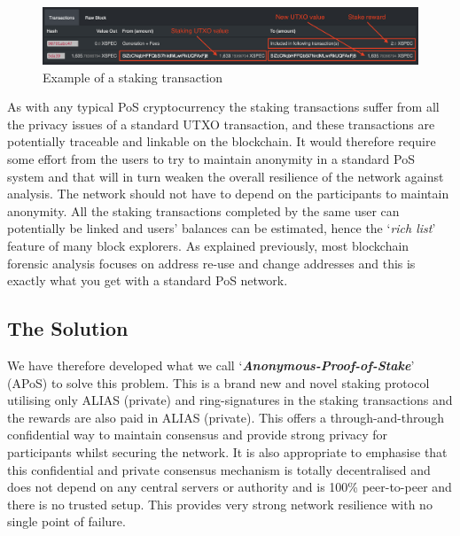 \begin{figure}[h]
    \centering
    \includegraphics[width=\textwidth]{Images/txnexample.png}
    \caption{Example of a staking transaction}
    \label{fig}
\end{figure}


\noindent
As with any typical PoS cryptocurrency the staking transactions suffer
from all the privacy issues of a standard UTXO transaction, and these
transactions are potentially traceable and linkable on the blockchain.
It would therefore require some effort from the users to try to maintain
anonymity in a standard PoS system and that will in turn weaken the overall
resilience of the network against analysis. The network should not have to
depend on the participants to maintain anonymity. All the staking
transactions completed by the same user can potentially be linked and users’
balances can be estimated, hence the ‘\textit{rich list}’ feature of many
block explorers. As explained previously, most blockchain forensic analysis
focuses on address re-use and change addresses and this is exactly what you
get with a standard PoS network.



\subsection{The Solution}
We have therefore developed what we call ‘\textbf{\textit{Anonymous-Proof-of-Stake}}’
(APoS) to solve this problem. This is a brand new and novel staking protocol
utilising only ALIAS (private) and ring-signatures in the staking transactions and
the rewards are also paid in ALIAS (private). This offers a through-and-through
confidential way to maintain consensus and provide strong privacy for
participants whilst securing the network. It is also appropriate to emphasise
that this confidential and private consensus mechanism is totally
decentralised and does not depend on any central servers or authority and is
100\% peer-to-peer and there is no trusted setup. This provides very strong
network resilience with no single point of failure.

